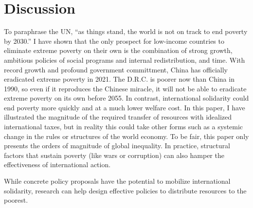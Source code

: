 \section{Discussion} 

To paraphrase the UN, ``as things stand, the world is not on track to end poverty by 2030.''\cite{un_sustainable_2022} I have shown that the only prospect for low-income countries to eliminate extreme poverty on their own is the combination of strong growth, ambitious policies of social programs and internal redistribution, and time. 
With record growth and profound government committment, China has officially eradicated extreme poverty in 2021. The D.R.C. is poorer now than China in 1990, %
so even if it reproduces the Chinese miracle, it will not be able to eradicate extreme poverty on its own before 2055. 
In contrast, international solidarity could end poverty more quickly and at a much lower welfare cost. In this paper, I have illustrated the magnitude of the required transfer of resources with idealized international taxes, but in reality this could take other forms such as a systemic change in the rules or structures of the world economy. 
To be fair, this paper only presents the orders of magnitude of global inequality. %
In practice, structural factors that sustain poverty (like wars or corruption) %
can also hamper the effectiveness of international action. %

While concrete policy proposals have the potential %
to mobilize international solidarity,\cite{fabre_international_2023} research can help design effective policies to distribute resources to the poorest.

